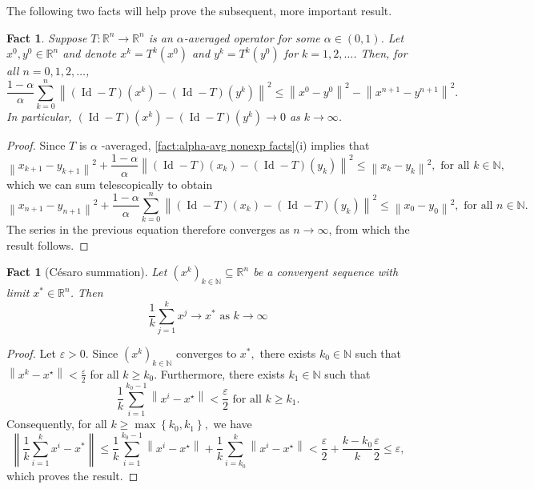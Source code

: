 \documentclass[smallextended,numbook,nospthms]{svjour3}
\theoremstyle{plain}
\newtheorem{fact}[theorem]{Fact}
\theoremstyle{definition}
\def\RR{\mathds R}
\def\NN{\mathds N}
\DeclareMathOperator{\Id}{Id}
\begin{document}
The following two facts will help prove the subsequent, more important result.
\begin{fact}\label{fact:alpha-avg lemma}
Suppose $T: \RR^n \rightarrow \RR^n$ is an $\alpha$-averaged operator for some $\alpha \in (0,1)$. Let $x^{0}, y^{0} \in \RR^n$ and denote $x^{k}=T^{k}\left(x^{0}\right)$ and $y^{k}=T^{k}\left(y^{0}\right)$ for $k=1,2, \ldots$. Then, for all $n=0,1,2, \ldots$, 
$$
\frac{1-\alpha}{\alpha} \sum_{k=0}^{n}\left\|(\operatorname{Id}-T)\left(x^{k}\right)-(\operatorname{Id}-T)\left(y^{k}\right)\right\|^{2} \leq\left\|x^{0}-y^{0}\right\|^{2}-\left\|x^{n+1}-y^{n+1}\right\|^{2}. 
$$
In particular, $(\Id-T)\left(x^{k}\right)-(\Id-T)\left(y^{k}\right) \rightarrow 0$ as $k \rightarrow \infty$.
\end{fact}
\begin{proof}
Since $T$ is $\alpha$ -averaged, \cref{fact:alpha-avg nonexp facts}(i) implies that
$$
\left\|x_{k+1}-y_{k+1}\right\|^{2}+\frac{1-\alpha}{\alpha}\left\|(\operatorname{Id}-T)\left(x_{k}\right)-(\Id-T)\left(y_{k}\right)\right\|^{2} \leq\left\|x_{k}-y_{k}\right\|^{2}, \text{ for all } k \in \NN,
$$
which we can sum telescopically to obtain
$$
\left\|x_{n+1}-y_{n+1}\right\|^{2}+\frac{1-\alpha}{\alpha} \sum_{k=0}^{n}\left\|(\operatorname{Id}-T)\left(x_{k}\right)-(\operatorname{Id}-T)\left(y_{k}\right)\right\|^{2} \leq\left\|x_{0}-y_{0}\right\|^{2}, \text{ for all } n \in \NN.
$$
The series in the previous equation therefore converges as $n \rightarrow \infty$, from which the result follows.
\end{proof}

\begin{fact}[Césaro summation]\label{fact:cesaro sum}
	Let $\left(x^{k}\right)_{k \in \NN} \subseteq \RR^n$ be a convergent sequence with limit $x^{*} \in \RR^n$. Then
	$$
	\frac{1}{k} \sum_{j=1}^{k} x^{j} \rightarrow x^* \text { as } k \rightarrow \infty
	$$
\end{fact}
\begin{proof}
	Let $\varepsilon>0$. Since $\left(x^{k}\right)_{k \in \NN}$ converges to $x^{*},$ there exists $k_{0} \in \NN$ such that $\left\|x^{k}-x^{\star}\right\|<\frac{\varepsilon}{2}$ for all $k \geq k_{0}$. Furthermore, there exists $k_{1} \in \NN$ such that
	$$
	\frac{1}{k} \sum_{i=1}^{k_{0}-1}\left\|x^{i}-x^{\star}\right\|<\frac{\varepsilon}{2} \text { for all } k \geq k_{1}.
	$$
	Consequently, for all $k \geq \max \left\{k_{0}, k_{1}\right\},$ we have
	$$
	\left\|\frac{1}{k} \sum_{i=1}^{k} x^{i}-x^{*}\right\| \leq \frac{1}{k} \sum_{i=1}^{k_{0}-1}\left\|x^{i}-x^{\star}\right\|+\frac{1}{k} \sum_{i=k_{0}}^{k}\left\|x^{i}-x^{\star}\right\|<\frac{\varepsilon}{2}+\frac{k-k_{0}}{k} \frac{\varepsilon}{2} \leq \varepsilon,
	$$
	which proves the result.
\end{proof}
\end{document}
